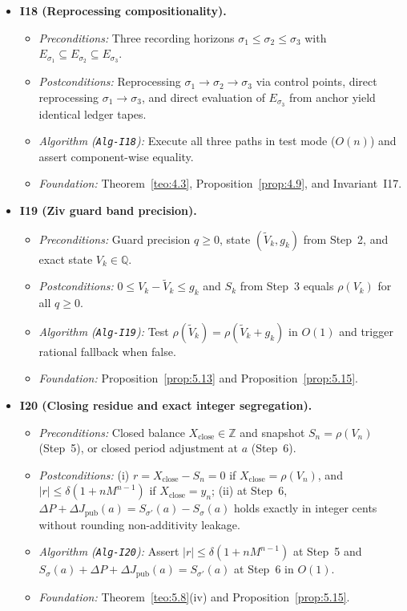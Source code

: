 \documentclass[11pt, a4paper]{article}
\theoremstyle{definition}
\theoremstyle{plain}
\theoremstyle{remark}
\begin{document}
\begin{itemize}
    \item \textbf{I18 (Reprocessing compositionality).}
    \begin{itemize}
        \item \emph{Preconditions:} Three recording horizons $\sigma_1 \le \sigma_2 \le \sigma_3$ with $E_{\sigma_1} \subseteq E_{\sigma_2} \subseteq E_{\sigma_3}$.
        \item \emph{Postconditions:} Reprocessing $\sigma_1 \to \sigma_2 \to \sigma_3$ via control points, direct reprocessing $\sigma_1 \to \sigma_3$, and direct evaluation of $E_{\sigma_3}$ from anchor yield identical ledger tapes.
        \item \emph{Algorithm (\texttt{Alg-I18}):} Execute all three paths in test mode ($O(n)$) and assert component-wise equality.
        \item \emph{Foundation:} Theorem~\ref{teo:4.3}, Proposition~\ref{prop:4.9}, and Invariant~I17.
    \end{itemize}

    \item \textbf{I19 (Ziv guard band precision).}
    \begin{itemize}
        \item \emph{Preconditions:} Guard precision $q \ge 0$, state $(\tilde{V}_k, g_k)$ from Step~2, and exact state $V_k \in \mathbb{Q}$.
        \item \emph{Postconditions:} $0 \le V_k - \tilde{V}_k \le g_k$ and $S_k$ from Step~3 equals $\rho(V_k)$ for all $q \ge 0$.
        \item \emph{Algorithm (\texttt{Alg-I19}):} Test $\rho(\tilde{V}_k) = \rho(\tilde{V}_k + g_k)$ in $O(1)$ and trigger rational fallback when false.
        \item \emph{Foundation:} Proposition~\ref{prop:5.13} and Proposition~\ref{prop:5.15}.
    \end{itemize}

    \item \textbf{I20 (Closing residue and exact integer segregation).}
    \begin{itemize}
        \item \emph{Preconditions:} Closed balance $X_{\text{close}} \in \mathbb{Z}$ and snapshot $S_n = \rho(V_n)$ (Step~5), or closed period adjustment at $a$ (Step~6).
        \item \emph{Postconditions:} (i) $r = X_{\text{close}} - S_n = 0$ if $X_{\text{close}} = \rho(V_n)$, and $|r| \le \delta(1 + n M^{n-1})$ if $X_{\text{close}} = y_n$; (ii) at Step~6, $\Delta P + \Delta J_{\text{pub}}(a) = S_{\sigma'}(a) - S_\sigma(a)$ holds exactly in integer cents without rounding non-additivity leakage.
        \item \emph{Algorithm (\texttt{Alg-I20}):} Assert $|r| \le \delta(1 + n M^{n-1})$ at Step~5 and $S_\sigma(a) + \Delta P + \Delta J_{\text{pub}}(a) = S_{\sigma'}(a)$ at Step~6 in $O(1)$.
        \item \emph{Foundation:} Theorem~\ref{teo:5.8}(iv) and Proposition~\ref{prop:5.15}.
    \end{itemize}
\end{itemize}
\end{document}
